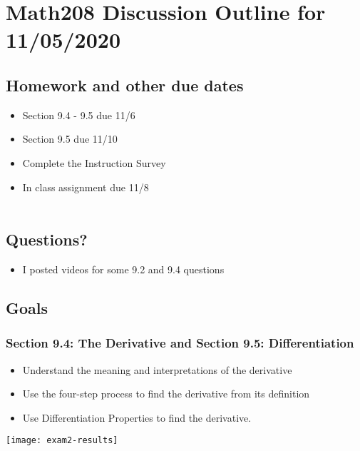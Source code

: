 \documentclass[14pt]{extarticle}
\begin{document}
\section*{Math208 Discussion Outline for 11/05/2020}

\subsection{Homework and other due dates}
\begin{itemize}
\item Section 9.4 - 9.5 due 11/6
\item Section 9.5 due 11/10
\item Complete the Instruction Survey
\item In class assignment due 11/8 \\\\
\end{itemize}

\subsection{Questions?}
\begin{itemize}
	\item I posted videos for some 9.2 and 9.4 questions
\end{itemize}

\subsection{Goals}
\subsubsection*{Section 9.4: The Derivative and Section 9.5: Differentiation}
\begin{itemize}
	\item Understand the meaning and interpretations of the derivative
	\item Use the four-step process to find the derivative from its definition
	\item Use Differentiation Properties to find the derivative.
\end{itemize}

\texttt{[image: exam2-results]}



\cleardoublepage
\end{document}
